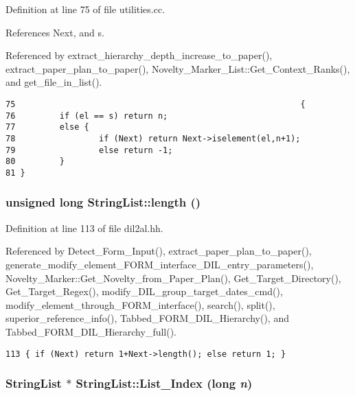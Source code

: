 Definition at line 75 of file utilities.cc.

References Next, and s.

Referenced by extract\_\-hierarchy\_\-depth\_\-increase\_\-to\_\-paper(), extract\_\-paper\_\-plan\_\-to\_\-paper(), Novelty\_\-Marker\_\-List::Get\_\-Context\_\-Ranks(), and get\_\-file\_\-in\_\-list().



\footnotesize\begin{verbatim}75                                                          {
76         if (el == s) return n;
77         else {
78                 if (Next) return Next->iselement(el,n+1);
79                 else return -1;
80         }
81 }
\end{verbatim}\normalsize 
{}
\subsubsection{\setlength{\rightskip}{0pt plus 5cm}unsigned long String\-List::length ()\hspace{0.3cm}{\tt  [inline]}}\label{classStringList_a10}




Definition at line 113 of file dil2al.hh.

Referenced by Detect\_\-Form\_\-Input(), extract\_\-paper\_\-plan\_\-to\_\-paper(), generate\_\-modify\_\-element\_\-FORM\_\-interface\_\-DIL\_\-entry\_\-parameters(), Novelty\_\-Marker::Get\_\-Novelty\_\-from\_\-Paper\_\-Plan(), Get\_\-Target\_\-Directory(), Get\_\-Target\_\-Regex(), modify\_\-DIL\_\-group\_\-target\_\-dates\_\-cmd(), modify\_\-element\_\-through\_\-FORM\_\-interface(), search(), split(), superior\_\-reference\_\-info(), Tabbed\_\-FORM\_\-DIL\_\-Hierarchy(), and Tabbed\_\-FORM\_\-DIL\_\-Hierarchy\_\-full().



\footnotesize\begin{verbatim}113 { if (Next) return 1+Next->length(); else return 1; }
\end{verbatim}\normalsize 
{}
\subsubsection{\setlength{\rightskip}{0pt plus 5cm}String\-List $\ast$ String\-List::List\_\-Index (long {\em n})}\label{classStringList_a7}





